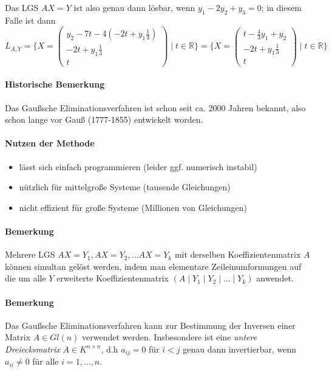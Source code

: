 	 Das LGS $ AX=Y $ ist also genau dann lösbar, wenn $ y_1-2y_2+y_3 = 0 $; in diesem Falle ist dann
	 	\[ L_{A,Y} = \{X =
	 		\begin{pmatrix} y_2-7t-4(-2t+y_1\frac{1}{3})\\-2t+y_1\frac{1}{3}\\t\end{pmatrix}
	 	\mid t\in \mathbb{R}\}
	 	= \{X =
	 		\begin{pmatrix} t-\frac{4}{3}y_1+y_2\\-2t+y_1\frac{1}{3}\\t\end{pmatrix}
	 	\mid t\in \mathbb{R}\} \]
\paragraph{Historische Bemerkung}
	Das Gaußsche Eliminationsverfahren ist schon seit ca. 2000 Jahren bekannt, also schon lange vor Gauß (1777-1855) entwickelt worden.
	
\paragraph{Nutzen der Methode}
	\begin{itemize}
		\item lässt sich einfach programmieren (leider ggf. numerisch instabil)
		\item nützlich für mittelgroße Systeme (tausende Gleichungen)
		\item nicht effizient für große Systeme (Millionen von Gleichungen)
	\end{itemize}
\paragraph{Bemerkung}
	Mehrere LGS $ AX = Y_1, AX = Y_2, \dots AX = Y_k $ mit derselben Koeffizientenmatrix $ A $ können simultan gelöst werden, indem man elementare Zeileinumformungen auf die um alle $ Y $ erweiterte Koeffizientenmatrix $ (A\mid Y_1\mid Y_2\mid \dots \mid Y_k) $ anwendet.
\paragraph{Bemerkung}
	Das Gaußsche Eliminationsverfahren kann zur Bestimmung der Inversen einer Matrix $ A\in Gl(n) $ verwendet werden. Insbesondere ist eine \emph{untere Dreiecksmatrix} $ A\in K^{n\times n} $, d.h $ a_{ij} = 0 $ für $ i<j $ genau dann invertierbar, wenn $ a_{ii}\neq 0 $ für alle $ i=1,\dots,n $.
